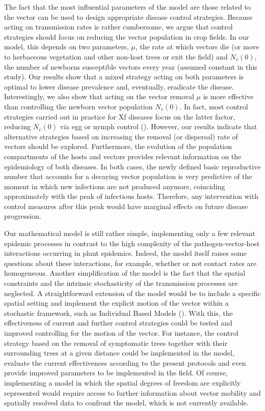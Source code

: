 The fact that the most influential parameters of the model are those
related to the vector can be used to design appropriate disease control
strategies. Because acting on transmission rates is rather cumbersome, we argue
that control strategies should focus on reducing the vector population in crop
fields. In our model, this depends on two parameters, $\mu$, the rate at which
vectors die (or move to herbaceous vegetation and other non-host trees or exit
the field) and $N_v(0)$, the number of newborns susceptible vectors every year
(assumed constant in this study). Our results show that a mixed strategy acting
on both parameters is optimal to lower disease prevalence and, eventually,
eradicate the disease. Interestingly, we also show that acting on the vector
removal $\mu$ is more effective than controlling the newborn vector population
$N_v(0)$. In fact, most control strategies carried out in practice for Xf
diseases focus on the latter factor, reducing $N_v(0)$ via egg or nymph control
(\cite{Cornara2018, lopez2022mechanical, Lago2022}). However, our results
indicate that alternative strategies based on increasing the removal (or
dispersal) rate of vectors should be explored. Furthermore, the evolution of
the population compartments of the hosts and vectors provides relevant
information on the epidemiology of both diseases. In both cases, the newly
defined basic reproductive number that accounts for a decaying vector
population is very predictive of the moment in which new infections are not
produced anymore, coinciding approximately with the peak of infectious hosts.
Therefore, any intervention with control measures after this peak would have
marginal effects on future disease progression.

Our mathematical model is still rather simple, implementing only a few
relevant epidemic processes in contrast to the high complexity of the
pathogen-vector-host interactions occurring in plant epidemics. Indeed, the
model itself raises some questions about these interactions, for example,
whether or not contact rates are homogeneous. Another simplification of the
model is the fact that the spatial constraints and the intrinsic stochasticity
of the transmission processes are neglected. A straightforward extension of the
model would be to include a specific spatial setting and implement the explicit
motion of the vector within a stochastic framework, such as Individual Based
Models (\cite{Grimm2005}). With this, the effectiveness of current and further
control strategies could be tested and improved controlling for the motion of
the vector. For instance, the control strategy based on the removal of
symptomatic trees together with their surrounding trees at a given distance
could be implemented in the model, evaluate the current effectiveness according
to the present protocols and even provide improved parameters to be implemented
in the field. Of course, implementing a model in which the spatial degrees of
freedom are explicitly represented would require access to further information
about vector mobility and spatially resolved data to confront the model, which
is not currently available.

